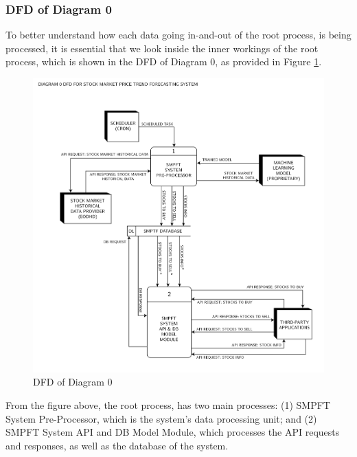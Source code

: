 \subsubsection{DFD of Diagram 0}
\label{subsubsec:dfd0}
To better understand how each data going in-and-out 
of the root process, is being processed, it is essential that we look inside 
the inner workings of the root process, which is shown in the DFD of Diagram 0, 
as provided in Figure \ref{fig:dfd0}.
\begin{figure}[ht]
    \centering
    \includegraphics[width=1\textwidth]{./assets//Data Flow Diagram-02.png}
    \caption{DFD of Diagram 0}
    \label{fig:dfd0}
\end{figure}
\FloatBarrier
\vspace{0.5cm}
From the figure above, the root process, has two main processes: 
(1) SMPFT System Pre-Processor, which is the system’s data processing unit; and 
(2) SMPFT System API and DB Model Module, which processes the API 
requests and responses, as well as the database of the system.
